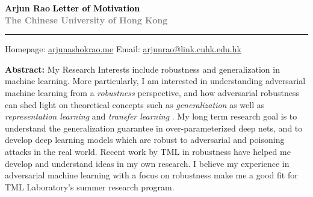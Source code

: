 \documentclass[12pt]{article}
\newcommand{\HRule}[1][\medskipamount]{\par
  \vspace*{\dimexpr-\parskip-\baselineskip+#1}
  \noindent\rule{\linewidth}{0.3mm}\par
  \vspace*{\dimexpr-\parskip-.3\baselineskip+#1}}
\begin{document}
\thispagestyle{empty}
\Large \textbf{Arjun Rao} \hfill \Large  \textbf{\textcolor{black}{\Large{Letter of Motivation} }} \\ \textcolor{gray}{\textbf{\hspace*{0.25in}\normalsize{The Chinese University of Hong Kong}}}
\HRule

\small Homepage: \href{https://arjunashokrao.me}{arjunashokrao.me} \quad Email: \href{mailto:arjunrao@link.cuhk.edu.hk}{arjunrao@link.cuhk.edu.hk}

\bigskip

\textbf{Abstract: }My Research Interests include robustness and generalization in machine learning. More particularly, I am interested in understanding adversarial machine learning from a \emph{robustness} perspective, and how adversarial robustness can shed light on theoretical concepts such as \emph{generalization} as well as \emph{representation learning} and \emph{transfer learning} \cite{Andriushchenko:273123}. My long term research goal is to understand the generalization guarantee in over-parameterized deep nets, and to develop deep learning models which are robust to adversarial and poisoning attacks in the real world. Recent work by TML in robustness \cite{croce2020robustbench,Andriushchenko:278914,Andriushchenko:273123} have helped me develop and understand ideas in my own research. I believe my experience in adversarial machine learning with a focus on robustness make me a good fit for TML Laboratory's summer research program.  \\
\end{document}
